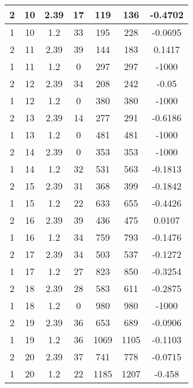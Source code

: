 \documentclass[letterpaper, 12pt]{article}
\begin{document}
\begin{longtable}{|c|c|c|c|c|c|c|}
\hline
2 & 10 & 2.39 & 17 & 119 & 136 & -0.4702 \\
\hline
1 & 10 & 1.2 & 33 & 195 & 228 & -0.0695 \\
\hline
2 & 11 & 2.39 & 39 & 144 & 183 & 0.1417 \\
\hline
1 & 11 & 1.2 & 0 & 297 & 297 & -1000 \\
\hline
2 & 12 & 2.39 & 34 & 208 & 242 & -0.05 \\
\hline
1 & 12 & 1.2 & 0 & 380 & 380 & -1000 \\
\hline
2 & 13 & 2.39 & 14 & 277 & 291 & -0.6186 \\
\hline
1 & 13 & 1.2 & 0 & 481 & 481 & -1000 \\
\hline
2 & 14 & 2.39 & 0 & 353 & 353 & -1000 \\
\hline
1 & 14 & 1.2 & 32 & 531 & 563 & -0.1813 \\
\hline
2 & 15 & 2.39 & 31 & 368 & 399 & -0.1842 \\
\hline
1 & 15 & 1.2 & 22 & 633 & 655 & -0.4426 \\
\hline
2 & 16 & 2.39 & 39 & 436 & 475 & 0.0107 \\
\hline
1 & 16 & 1.2 & 34 & 759 & 793 & -0.1476 \\
\hline
2 & 17 & 2.39 & 34 & 503 & 537 & -0.1272 \\
\hline
1 & 17 & 1.2 & 27 & 823 & 850 & -0.3254 \\
\hline
2 & 18 & 2.39 & 28 & 583 & 611 & -0.2875 \\
\hline
1 & 18 & 1.2 & 0 & 980 & 980 & -1000 \\
\hline
2 & 19 & 2.39 & 36 & 653 & 689 & -0.0906 \\
\hline
1 & 19 & 1.2 & 36 & 1069 & 1105 & -0.1103 \\
\hline
2 & 20 & 2.39 & 37 & 741 & 778 & -0.0715 \\
\hline
1 & 20 & 1.2 & 22 & 1185 & 1207 & -0.458 \\
\hline
\end{longtable}
\end{document}
